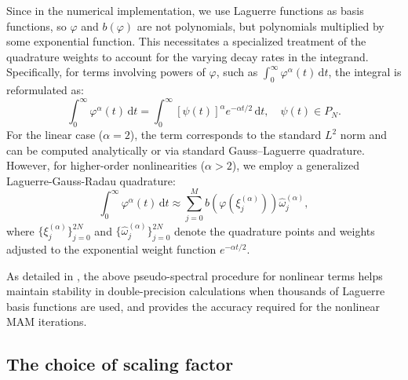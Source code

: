 \documentclass[a4paper,fleqn, 12pt]{cas-sc}
\newcommand{\diff}{\,\mathrm{d}}
\numberwithin{table}{section}
\begin{document}
Since in the numerical implementation,  we use Laguerre functions as basis functions, so $\varphi$ and $b (\varphi)$ are not polynomials, but polynomials multiplied by some exponential function. This necessitates a specialized treatment of the quadrature weights to account for the varying decay rates in the integrand. Specifically, for terms involving powers of $\varphi$, such as $\int_0^{\infty} \varphi^{\alpha}(t) \diff t$, the integral is reformulated as:
\[
    \int_0^{\infty} \varphi^{\alpha}(t) \diff t = \int_0^{\infty} \left[ \psi(t) \right]^{\alpha} e^{-\alpha t / 2} \diff t, \quad \psi(t) \in P_N.
\]
For the linear case ($\alpha=2$), the term corresponds to the standard $L^2$ norm and can be computed analytically or via standard Gauss--Laguerre quadrature. However, for higher-order nonlinearities ($\alpha > 2$), we employ a generalized Laguerre-Gauss-Radau quadrature:
\[
    \int_0^{\infty} \varphi^{\alpha}(t) \diff t \approx \sum_{j=0}^{M} b(\varphi(\xi_j^{(\alpha)})) \hat{\omega}_j^{(\alpha)},
\]
where $\{\xi_j^{(\alpha)}\}_{j=0}^{2N}$ and $\{\hat{\omega}_j^{(\alpha)}\}_{j=0}^{2N}$ denote the quadrature points and weights adjusted to the exponential weight function $e^{-\alpha t/2}$. 

As detailed in \cite{huang2024improved}, the above pseudo-spectral procedure for nonlinear terms helps maintain stability in double-precision calculations when thousands of Laguerre basis functions are used, and provides the accuracy required for the nonlinear MAM iterations.

\subsection{The choice of scaling factor}


\end{document}
